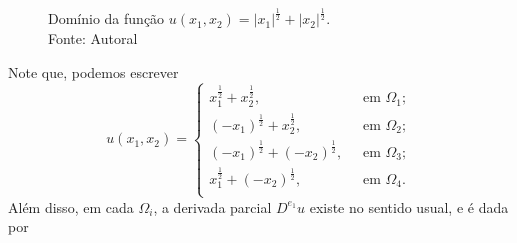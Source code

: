 \documentclass[a4paper, 11pt]{book}
\theoremstyle{definition}
\begin{document}
\begin{ex}
\begin{figure}[H]
        \caption{Domínio da função $u(x_1,x_2) = |x_1|^{\frac{1}{2}} + |x_2|^{\frac{1}{2}}$.\\
        Fonte: Autoral}
        \label{fig:dominio}
    \end{figure}
    Note que, podemos escrever
    \begin{equation}
        u(x_1,x_2) =
        \left\{
            \begin{array}{lr}
                x_1^{\frac{1}{2}} + x_2^{\frac{1}{2}}, &\;\text{ em } \Omega_1;\\
                (-x_1)^{\frac{1}{2}} + x_2^{\frac{1}{2}}, &\;\text{ em } \Omega_2;\\
                (-x_1)^{\frac{1}{2}} + (-x_2)^{\frac{1}{2}}, &\;\text{ em } \Omega_3;\\
                x_1^{\frac{1}{2}} + (-x_2)^{\frac{1}{2}}, &\;\text{ em } \Omega_4.\\
            \end{array}
        \right.
    \end{equation}
    Além disso, em cada $\Omega_i$, a derivada parcial $D^{e_1}u$ existe no sentido usual, e é dada por

\end{ex}
\end{document}

